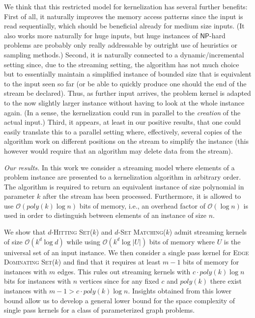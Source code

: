 \documentclass[draft,a4paper]{llncs}
\newcommand{\Oh}{\mathcal{O}}
\newcommand{\NP}{\ensuremath{\mathsf{NP}}\xspace}
\newcommand{\dHSk}{$d$-\textsc{Hitting Set($k$)}\xspace}
\newcommand{\dSMk}{$d$-\textsc{Set Matching($k$)}\xspace}
\newcommand{\EDSk}{\textsc{Edge Dominating Set($k$)}\xspace}
\begin{document}
We think that this restricted model for kernelization has several further benefits: First of all, it naturally improves the memory access patterns since the input is read sequentially, which should be beneficial already for medium size inputs. (It also works more naturally for huge inputs, but huge instances of \NP-hard problems are probably only really addressable by outright use of heuristics or sampling methods.) Second, it is naturally connected to a dynamic/incremental setting since, due to the streaming setting, the algorithm has not much choice but to essentially maintain a simplified instance of bounded size that is equivalent to the input seen so far (or be able to quickly produce one should the end of the stream be declared). Thus, as further input arrives, the problem kernel is adapted to the now slightly larger instance without having to look at the whole instance again. (In a sense, the kernelization could run in parallel to the \emph{creation} of the 
actual input.) Third, it 
appears, at least in our positive results, that one could easily translate this to a parallel setting where, effectively, several copies of the algorithm work on different positions on the stream to simplify the instance (this however would require that an algorithm may delete data from the stream).

\emph{Our results.}
In this work we consider a streaming model where elements of a problem instance are presented to a kernelization algorithm in arbitrary order. The algorithm is required to return an equivalent instance of size polynomial in parameter $k$ after the stream has been processed. Furthermore, it is allowed to use $\Oh(poly(k) \log n)$ bits of memory, i.e., an overhead factor of $\Oh(\log n)$ is used in order to distinguish between elements of an instance of size $n$.

We show that \dHSk and \dSMk admit streaming kernels of size $\Oh(k^d \log d)$ while using $\Oh(k^d \log |U|)$ bits of memory where $U$ is the universal set of an input instance. We then consider a single pass kernel for \EDSk and find that it requires at least $m-1$ bits of memory for instances with $m$ edges. This rules out streaming kernels with $c \cdot poly(k) \log n$ bits for instances with $n$ vertices since for any fixed $c$ and $poly(k)$ there exist instances with $m-1 > c \cdot poly(k) \log n$. Insights obtained from this lower bound allow us to develop a general lower bound for the space complexity of single pass kernels for a class of parameterized graph problems. 
\end{document}
